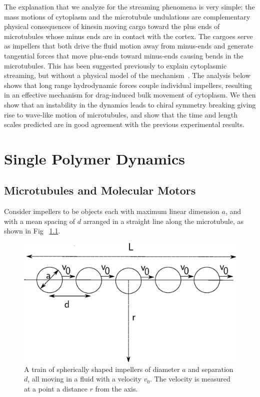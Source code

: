 \documentclass[11pt]{ucthesis}
\begin{document}
The explanation
that we analyze for the streaming phenomena is very simple: the
mass motions of cytoplasm and the microtubule undulations are complementary
physical consequences of kinesin moving cargo 
toward the plus ends of microtubules whose minus ends
are in contact with the cortex. The cargoes serve as impellers that
both drive the fluid motion away from minus-ends and generate
tangential forces that move plus-ends toward minus-ends causing
bends in the microtubules. This has been suggested previously to
explain cytoplasmic streaming, but without a physical model of the
mechanism~\cite{SerbusSaxton}. The analysis below shows that long range hydrodynamic
forces couple individual impellers, resulting in an effective
mechanism for drag-induced bulk movement of cytoplasm.  We then
show that an instability in the dynamics leads to chiral symmetry breaking giving rise to
wave-like motion of microtubules, and show that the time and length scales
predicted are in good agreement with the previous experimental
results.

\chapter{Single Polymer Dynamics}

\section{Microtubules and Molecular Motors}
Consider impellers to be objects each with maximum linear dimension
$a$, and with a mean spacing of $d$ arranged in a straight line along the microtubule, as shown in Fig ~\ref{fig:spheres}. 

\begin{figure}[htp]
\begin{center}
\includegraphics[width=\hsize]{spheres.eps}
\caption{ 
A train of spherically shaped impellers of diameter $a$ and separation $d$, all moving in a fluid with a velocity $v_0$.
The velocity is measured at a point a distance $r$ from the axis.
}
\label{fig:spheres}
\end{center}
\end{figure}
\end{document}
